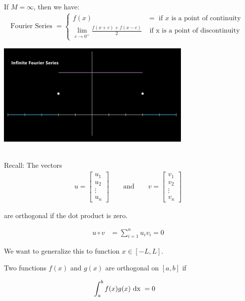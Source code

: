 \documentclass{article}
\begin{document}
  If $M = \infty$, then we have:
  \begin{align}
    \text{Fourier Series } =
    \begin{cases}
      f(x) & = \text{ if $x$ is a point of continuity }\\
      \lim_{c \to 0^+} \frac{f(x + c) + f(x - c)}{2} & \text{ if x is a point of discontinuity}
    \end{cases}
  \end{align}

  \begin{center}
    \includegraphics[height=5cm]{Fourier Infinite Fourier Series}
  \end{center}

  \\
  Recall: The vectors
  \begin{align}
    u =
    \begin{bmatrix}
      u_1\\
      u_2\\
      \vdots\\
      u_n
    \end{bmatrix}
    \qquad \text{and} \qquad
    v =
    \begin{bmatrix}
      v_1\\
      v_2\\
      \vdots\\
      v_n
    \end{bmatrix}
  \end{align}

  are orthogonal if the dot product is zero.

  \begin{align}
    u \circ v & = \sum^n_{i = 1} u_i v_i = 0
  \end{align}

  We want to generalize this to function $x \in [-L, L]$.

  \dfn Two functions $f(x)$ and $g(x)$ are orthogonal on $[a, b]$ if

  \begin{align}
    \int^b_a f(x)g(x) \text{ dx } & = 0
  \end{align}
\end{document}
